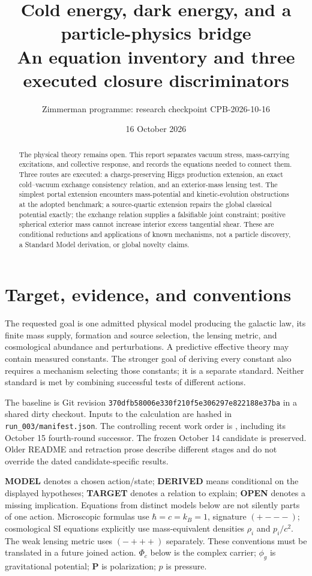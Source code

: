 \documentclass[11pt]{article}
\title{Cold energy, dark energy, and a particle-physics bridge\\
An equation inventory and three executed closure discriminators}
\author{Zimmerman programme: research checkpoint CPB-2026-10-16}
\date{16 October 2026}
\begin{document}
\maketitle
\begin{abstract}
The physical theory remains open. This report separates vacuum stress,
mass-carrying excitations, and collective response, and records the equations
needed to connect them. Three routes are executed: a charge-preserving Higgs
production extension, an exact cold--vacuum exchange consistency relation,
and an exterior-mass lensing test. The simplest portal extension encounters
mass-potential and kinetic-evolution obstructions at the adopted benchmark;
a source-quartic extension repairs the global classical potential exactly;
the exchange relation supplies a falsifiable joint constraint; positive
spherical exterior mass cannot increase interior excess tangential shear.
These are conditional reductions and applications of known mechanisms,
not a particle discovery, a Standard Model derivation, or global novelty claims.
\end{abstract}

\section{Target, evidence, and conventions}
The requested goal is one admitted physical model producing the galactic law,
its finite mass supply, formation and source selection, the lensing metric,
and cosmological abundance and perturbations. A predictive effective theory
may contain measured constants. The stronger goal of deriving every constant
also requires a mechanism selecting those constants; it is a separate standard.
Neither standard is met by combining successful tests of different actions.

The baseline is Git revision
\texttt{370dfb58006e330f210f5e306297e822188e37ba} in a shared dirty checkout.
Inputs to the calculation are hashed in \texttt{run\_003/manifest.json}.
The controlling recent work order is
, including its October 15
fourth-round successor. The frozen October 14 candidate is preserved.
Older README and retraction prose describe different stages and do not
override the dated candidate-specific results.

\textbf{MODEL} denotes a chosen action/state; \textbf{DERIVED} means conditional
on the displayed hypotheses; \textbf{TARGET} denotes a relation to explain;
\textbf{OPEN} denotes a missing implication. Equations from distinct models
below are not silently parts of one action. Microscopic formulas use
$\hbar=c=k_B=1$, signature $(+---)$; cosmological SI equations explicitly
use mass-equivalent densities $\rho_i$ and $p_i/c^2$. The weak lensing metric
uses $(-+++)$ separately. These conventions must be translated in a future
joined action. $\Phi_c$ below is the complex carrier; $\phi_g$ is gravitational
potential; $\mathbf P$ is polarization; $p$ is pressure.
\end{document}
